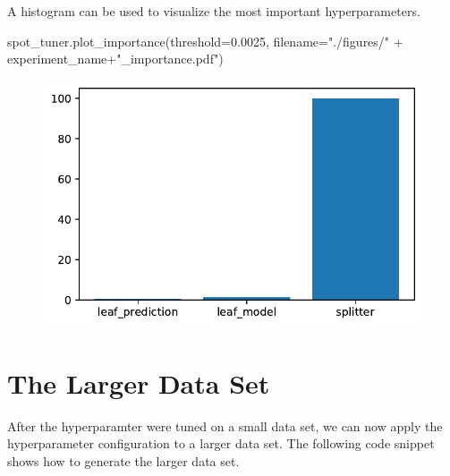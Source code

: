 \documentclass[
  letterpaper,
  DIV=11,
  numbers=noendperiod]{scrreprt}
\newenvironment{Shaded}{\begin{snugshade}}{\end{snugshade}}
\newcommand{\FloatTok}[1]{\textcolor[rgb]{0.68,0.00,0.00}{#1}}
\newcommand{\NormalTok}[1]{\textcolor[rgb]{0.00,0.23,0.31}{#1}}
\newcommand{\OperatorTok}[1]{\textcolor[rgb]{0.37,0.37,0.37}{#1}}
\newcommand{\StringTok}[1]{\textcolor[rgb]{0.13,0.47,0.30}{#1}}
\begin{document}
A histogram can be used to visualize the most important hyperparameters.

\begin{Shaded}
\begin{Highlighting}[]
\NormalTok{spot\_tuner.plot\_importance(threshold}\OperatorTok{=}\FloatTok{0.0025}\NormalTok{, filename}\OperatorTok{=}\StringTok{"./figures/"} \OperatorTok{+}\NormalTok{ experiment\_name}\OperatorTok{+}\StringTok{"\_importance.pdf"}\NormalTok{)}
\end{Highlighting}
\end{Shaded}

\begin{figure}[H]

{\centering \includegraphics{13_spot_hpt_river_files/figure-pdf/cell-23-output-1.pdf}

}

\end{figure}

\hypertarget{the-larger-data-set}{%
\section{The Larger Data Set}\label{the-larger-data-set}}

After the hyperparamter were tuned on a small data set, we can now apply
the hyperparameter configuration to a larger data set. The following
code snippet shows how to generate the larger data set.
\end{document}
